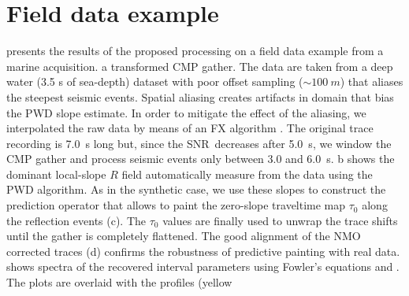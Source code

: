 \section{Field data example}



 presents the results of the proposed \taup processing on a
 field data example from a marine acquisition.  a   \taup transformed CMP gather. The data are taken
 from a deep water (3.5 s of sea-depth) dataset with poor offset
 sampling ($\sim 100~m$) that aliases the steepest seismic
 events. Spatial aliasing creates artifacts in \taup domain that bias
 the PWD slope estimate.  In order to mitigate the effect of the
 aliasing, we interpolated the raw data by means of an FX algorithm
 \citep{spitz:785}.  The original trace recording is 7.0~s long but,
 since the SNR\ decreases  after 5.0~s,  we window the CMP
 gather and  process seismic events only between 3.0 and
 6.0~s.    b
 shows the  dominant local-slope $R$ field 
 automatically measure from the data using the PWD algorithm. As in
 the synthetic case, we use these slopes to construct the prediction
 operator that allows  to paint the zero-slope traveltime map
 $\tau_0$ along the reflection events (c).  The $\tau_0$
 values are finally used to unwrap the trace shifts until the gather
 is completely flattened. The good alignment of the NMO corrected
 traces (d) confirms the robustness of predictive painting
 with real data.   shows spectra of the
 recovered interval parameters using Fowler's equations 
 and . The plots are overlaid with the profiles (yellow

